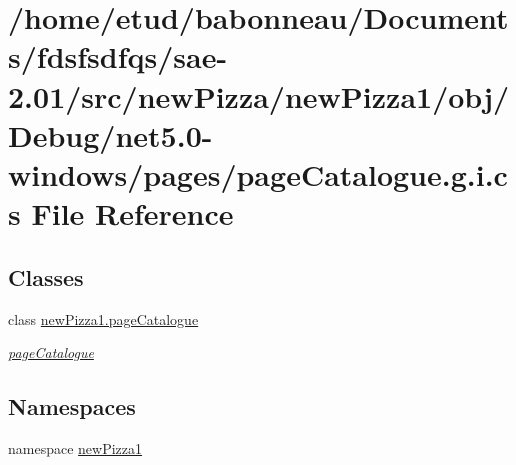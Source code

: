 \hypertarget{net5_80-windows_2pages_2pageCatalogue_8g_8i_8cs}{}\section{/home/etud/babonneau/\+Documents/fdsfsdfqs/sae-\/2.01/src/new\+Pizza/new\+Pizza1/obj/\+Debug/net5.0-\/windows/pages/page\+Catalogue.g.\+i.\+cs File Reference}
\label{net5_80-windows_2pages_2pageCatalogue_8g_8i_8cs}
\subsection*{Classes}
\begin{DoxyCompactItemize}
\item 
class \hyperlink{classnewPizza1_1_1pageCatalogue}{new\+Pizza1.\+page\+Catalogue}
\begin{DoxyCompactList}\small\item\em \hyperlink{classnewPizza1_1_1pageCatalogue}{page\+Catalogue} \end{DoxyCompactList}\end{DoxyCompactItemize}
\subsection*{Namespaces}
\begin{DoxyCompactItemize}
\item 
namespace \hyperlink{namespacenewPizza1}{new\+Pizza1}
\end{DoxyCompactItemize}
